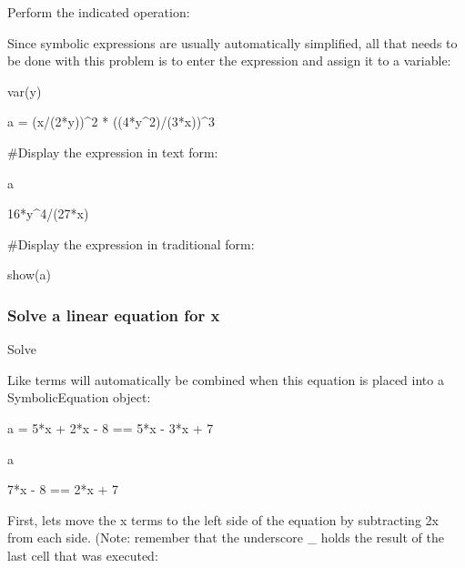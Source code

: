 \documentclass[12pt,twoside]{book}
\begin{document}
Perform the indicated operation: 


\bigskip

{\textquotedbl}{\textquotedbl}{\textquotedbl}

Since symbolic expressions are usually automatically simplified, all that needs to be done with this problem is to enter the expression and assign it to a variable:

{\textquotedbl}{\textquotedbl}{\textquotedbl}


\bigskip

var({\textquotesingle}y{\textquotesingle})

a = (x/(2*y))\^{}2 * ((4*y\^{}2)/(3*x))\^{}3


\bigskip

\#Display the expression in text form:

a

{\textbar}

16*y\^{}4/(27*x)


\bigskip


\bigskip

\#Display the expression in traditional form:

show(a)

{\textbar}

 

 


\bigskip

\subsubsection[Solve a linear equation for x]{Solve a linear equation for x}

Solve 


\bigskip

{\textquotedbl}{\textquotedbl}{\textquotedbl}

Like terms will automatically be combined when this equation is placed into a SymbolicEquation object:

{\textquotedbl}{\textquotedbl}{\textquotedbl}

a = 5*x + 2*x {}- 8 == 5*x {}- 3*x + 7

a

{\textbar}

7*x {}- 8 == 2*x + 7

{\textquotedbl}{\textquotedbl}{\textquotedbl}

First, lets move the x terms to the left side of the equation by subtracting 2x from each side. (Note: remember that the underscore {\textquotesingle}\_{\textquotesingle} holds the result of the last cell that was executed:
\end{document}
